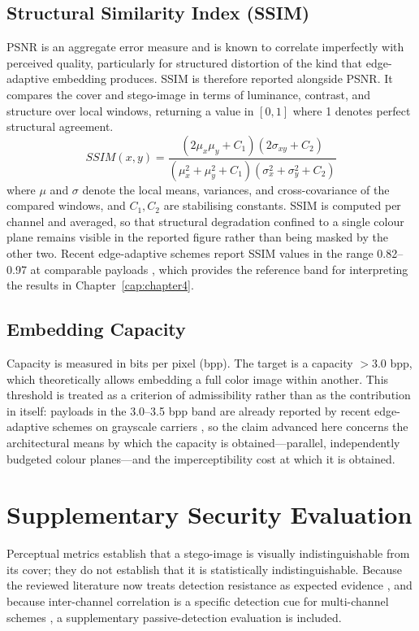 \subsection{Structural Similarity Index (SSIM)}
PSNR is an aggregate error measure and is known to correlate imperfectly with perceived quality, particularly for structured distortion of the kind that edge-adaptive embedding produces. SSIM is therefore reported alongside PSNR. It compares the cover and stego-image in terms of luminance, contrast, and structure over local windows, returning a value in $[0,1]$ where 1 denotes perfect structural agreement.
\begin{equation}
    SSIM(x,y) = \frac{(2\mu_x\mu_y + C_1)(2\sigma_{xy} + C_2)}{(\mu_x^2 + \mu_y^2 + C_1)(\sigma_x^2 + \sigma_y^2 + C_2)}
\end{equation}
where $\mu$ and $\sigma$ denote the local means, variances, and cross-covariance of the compared windows, and $C_1, C_2$ are stabilising constants. SSIM is computed per channel and averaged, so that structural degradation confined to a single colour plane remains visible in the reported figure rather than being masked by the other two. Recent edge-adaptive schemes report SSIM values in the range 0.82--0.97 at comparable payloads \citep{singh2026edgeopt, patwari2025dilatedlog, ismail2026edgeadaptive}, which provides the reference band for interpreting the results in Chapter~\ref{cap:chapter4}.

\subsection{Embedding Capacity}
Capacity is measured in bits per pixel (bpp). The target is a capacity $> 3.0$ bpp, which theoretically allows embedding a full color image within another. This threshold is treated as a criterion of admissibility rather than as the contribution in itself: payloads in the 3.0--3.5 bpp band are already reported by recent edge-adaptive schemes on grayscale carriers \citep{patwari2025dilatedlog, singh2026edgeopt}, so the claim advanced here concerns the architectural means by which the capacity is obtained---parallel, independently budgeted colour planes---and the imperceptibility cost at which it is obtained.

\section{Supplementary Security Evaluation} \label{sec:ch3-security}
Perceptual metrics establish that a stego-image is visually indistinguishable from its cover; they do not establish that it is statistically indistinguishable. Because the reviewed literature now treats detection resistance as expected evidence \citep{kombrink2025survey}, and because inter-channel correlation is a specific detection cue for multi-channel schemes \citep{amrutha2023rgbsteganalysis}, a supplementary passive-detection evaluation is included.

